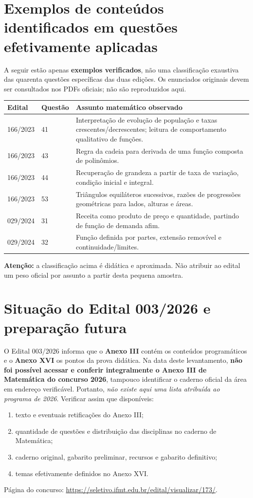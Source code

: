 \documentclass[11pt,a4paper]{article}
\begin{document}
\section{Exemplos de conteúdos identificados em questões efetivamente aplicadas}
A seguir estão apenas \textbf{exemplos verificados}, não uma classificação exaustiva das quarenta questões específicas das duas edições. Os enunciados originais devem ser consultados nos PDFs oficiais; não são reproduzidos aqui.
\begin{longtable}{p{}p{}p{}}
\toprule
\textbf{Edital}&\textbf{Questão}&\textbf{Assunto matemático observado}\\\midrule\endhead
166/2023 & 41 & Interpretação de evolução de população e taxas crescentes/decrescentes; leitura de comportamento qualitativo de funções.\\
166/2023 & 43 & Regra da cadeia para derivada de uma função composta de polinômios.\\
166/2023 & 44 & Recuperação de grandeza a partir de taxa de variação, condição inicial e integral.\\
166/2023 & 53 & Triângulos equiláteros sucessivos, razões de progressões geométricas para lados, alturas e áreas.\\
029/2024 & 31 & Receita como produto de preço e quantidade, partindo de função de demanda afim.\\
029/2024 & 32 & Função definida por partes, extensão removível e continuidade/limites.\\
\bottomrule
\end{longtable}
\textbf{Atenção:} a classificação acima é didática e aproximada. Não atribuir ao edital um peso oficial por assunto a partir desta pequena amostra.

\section{Situação do Edital 003/2026 e preparação futura}
O Edital 003/2026 informa que o \textbf{Anexo III} contém os conteúdos programáticos e o \textbf{Anexo XVI} os pontos da prova didática. Na data deste levantamento, \textbf{não foi possível acessar e conferir integralmente o Anexo III de Matemática do concurso 2026}, tampouco identificar o caderno oficial da área em endereço verificável. Portanto, \emph{não existe aqui uma lista atribuída ao programa de 2026}. Verificar assim que disponíveis:
\begin{enumerate}
\item texto e eventuais retificações do Anexo III;
\item quantidade de questões e distribuição das disciplinas no caderno de Matemática;
\item caderno original, gabarito preliminar, recursos e gabarito definitivo;
\item temas efetivamente definidos no Anexo XVI.
\end{enumerate}
Página do concurso: \url{https://seletivo.ifmt.edu.br/edital/visualizar/173/}.
\end{document}
